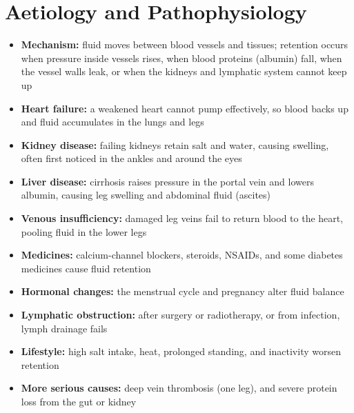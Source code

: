 \section*{Aetiology and Pathophysiology}
\begin{itemize}
    \item \textbf{Mechanism:} fluid moves between blood vessels and tissues; retention occurs when pressure inside vessels rises, when blood proteins (albumin) fall, when the vessel walls leak, or when the kidneys and lymphatic system cannot keep up
    \item \textbf{Heart failure:} a weakened heart cannot pump effectively, so blood backs up and fluid accumulates in the lungs and legs
    \item \textbf{Kidney disease:} failing kidneys retain salt and water, causing swelling, often first noticed in the ankles and around the eyes
    \item \textbf{Liver disease:} cirrhosis raises pressure in the portal vein and lowers albumin, causing leg swelling and abdominal fluid (ascites)
    \item \textbf{Venous insufficiency:} damaged leg veins fail to return blood to the heart, pooling fluid in the lower legs
    \item \textbf{Medicines:} calcium-channel blockers, steroids, NSAIDs, and some diabetes medicines cause fluid retention
    \item \textbf{Hormonal changes:} the menstrual cycle and pregnancy alter fluid balance
    \item \textbf{Lymphatic obstruction:} after surgery or radiotherapy, or from infection, lymph drainage fails
    \item \textbf{Lifestyle:} high salt intake, heat, prolonged standing, and inactivity worsen retention
    \item \textbf{More serious causes:} deep vein thrombosis (one leg), and severe protein loss from the gut or kidney
\end{itemize}

